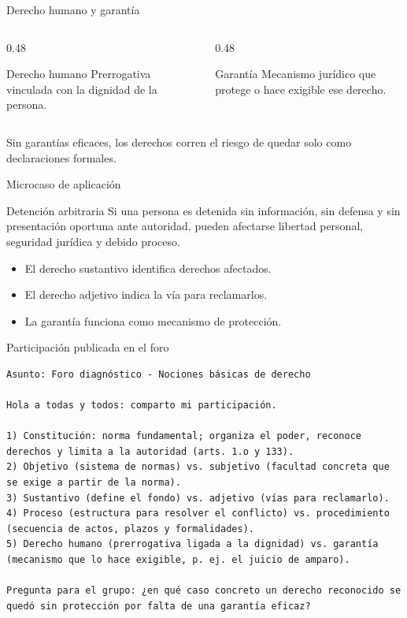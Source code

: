 \documentclass[
  spanish,
  aspectratio=169,
  xcolor={dvipsnames,table}
]{beamer}
\begin{document}
\begin{frame}{Derecho humano y garantía}
  \begin{columns}[T]
    \begin{column}{0.48\linewidth}
      \begin{block}{Derecho humano}
        Prerrogativa vinculada con la dignidad de la persona.
      \end{block}
    \end{column}
    \begin{column}{0.48\linewidth}
      \begin{block}{Garantía}
        Mecanismo jurídico que protege o hace exigible ese derecho.
      \end{block}
    \end{column}
  \end{columns}
  \vspace{0.25cm}
  Sin garantías eficaces, los derechos corren el riesgo de quedar solo como declaraciones formales.
\end{frame}

\begin{frame}{Microcaso de aplicación}
  \begin{block}{Detención arbitraria}
    Si una persona es detenida sin información, sin defensa y sin presentación oportuna ante autoridad, pueden afectarse libertad personal, seguridad jurídica y debido proceso.
  \end{block}
  \begin{itemize}
    \item El derecho sustantivo identifica derechos afectados.
    \item El derecho adjetivo indica la vía para reclamarlos.
    \item La garantía funciona como mecanismo de protección.
  \end{itemize}
\end{frame}

\begin{frame}[fragile]{Participación publicada en el foro}
  \begin{lstlisting}[style=foroplano]
Asunto: Foro diagnóstico - Nociones básicas de derecho

Hola a todas y todos: comparto mi participación.

1) Constitución: norma fundamental; organiza el poder, reconoce derechos y limita a la autoridad (arts. 1.o y 133).
2) Objetivo (sistema de normas) vs. subjetivo (facultad concreta que se exige a partir de la norma).
3) Sustantivo (define el fondo) vs. adjetivo (vías para reclamarlo).
4) Proceso (estructura para resolver el conflicto) vs. procedimiento (secuencia de actos, plazos y formalidades).
5) Derecho humano (prerrogativa ligada a la dignidad) vs. garantía (mecanismo que lo hace exigible, p. ej. el juicio de amparo).

Pregunta para el grupo: ¿en qué caso concreto un derecho reconocido se quedó sin protección por falta de una garantía eficaz?
  \end{lstlisting}
\end{frame}
\end{document}
